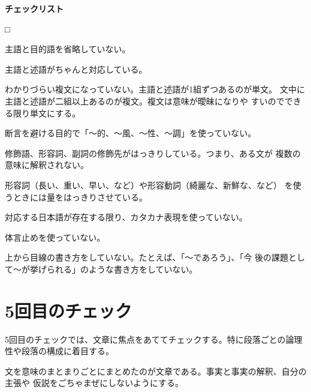 \documentclass[11pt,a4j]{jsarticle}
\begin{document}
\begin{flushleft}
 {\bf チェックリスト}
\end{flushleft}
\begin{list}%
 {□} %
 {} %
 \item 主語と目的語を省略していない。
 \item 主語と述語がちゃんと対応している。
 \item わかりづらい複文になっていない。主語と述語が1組ずつあるのが単文。
       文中に主語と述語が二組以上あるのが複文。複文は意味が曖昧になりや
       すいのでできる限り単文にする。
 \item 断言を避ける目的で「〜的、〜風、〜性、〜調」を使っていない。
 \item 修飾語、形容詞、副詞の修飾先がはっきりしている。つまり、ある文が
       複数の意味に解釈されない。
 \item 形容詞（長い、重い、早い、など）や形容動詞（綺麗な、新鮮な、など）
       を使うときには量をはっきりさせている。
 \item 対応する日本語が存在する限り、カタカナ表現を使っていない。
 \item 体言止めを使っていない。
 \item 上から目線の書き方をしていない。たとえば、「〜であろう」、「今
       後の課題として〜が挙げられる」のような書き方をしていない。
\end{list}

\section{5回目のチェック}

5回目のチェックでは、文章に焦点をあててチェックする。特に段落ごとの論理
性や段落の構成に着目する。

文を意味のまとまりごとにまとめたのが文章である。事実と事実の解釈、自分の主張や
仮説をごちゃまぜにしないようにする。
\end{document}
